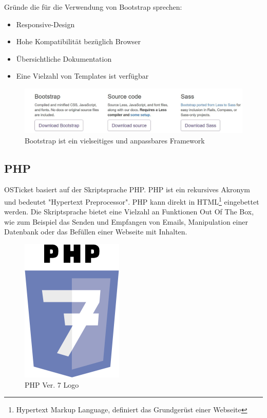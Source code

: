 	Gründe die für die Verwendung von Bootstrap sprechen:
	\begin{itemize}
		\item Responsive-Design
		\item Hohe Kompatibilität bezüglich Browser
		\item Übersichtliche Dokumentation 
		\item Eine Vielzahl von Templates ist verfügbar
	\end{itemize}
\begin{figure}[h]
	\centering
	\includegraphics[scale=0.7]{figures/bootstrap.jpg}
	\caption{Bootstrap ist ein vielseitiges und anpassbares Framework}
	\label{Bootstrap Page Screenshot}
\end{figure}
	\subsection{PHP}
	OSTicket basiert auf der Skriptsprache PHP. PHP ist ein rekursives Akronym und bedeutet "Hypertext Preprocessor". PHP kann direkt in HTML\footnote{Hypertext Markup Language, definiert das Grundgerüst einer Webseite} eingebettet werden. Die Skriptsprache bietet eine Vielzahl an Funktionen Out Of The Box, wie zum Beispiel das Senden und Empfangen von Emails, Manipulation einer Datenbank oder das Befüllen einer Webseite mit Inhalten.
	
	\begin{figure}[h]
		\centering
		\includegraphics[scale=.6]{figures/php_logo.png}
		\caption{PHP Ver. 7 Logo}
		\label{PHP_Logo}
	\end{figure}
	

